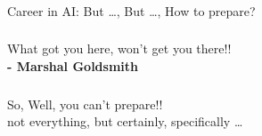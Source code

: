 \begin{frame}[fragile]\frametitle{}
\begin{center}
{\Large Career in AI: But \ldots, But \ldots, How to prepare?}
\end{center}
\end{frame}


\begin{frame}[fragile]\frametitle{}
	
	\begin{center}
	{\Large What got you here,  won’t get you there!!} \\
	{\bf - Marshal Goldsmith}
	\end{center}

\end{frame}

\begin{frame}[fragile]\frametitle{}
	
	\begin{center}
	{\Large So, Well, you can’t prepare!!}  \\
	
	not everything, but certainly, specifically \ldots
	\end{center}

\end{frame}


	


